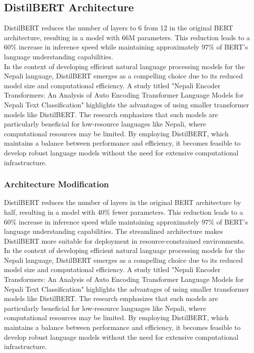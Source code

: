 \subsection{DistilBERT Architecture}
DistilBERT reduces the number of layers to 6 from 12 in the original BERT architecture, resulting in a model with 66M parameters. This reduction leads to a 60\% increase in inference speed while maintaining approximately 97\% of BERT's language understanding capabilities.\\



In the context of developing efficient natural language processing models for the Nepali language, DistilBERT emerges as a compelling choice due to its reduced model size and computational efficiency. A study titled "Nepali Encoder Transformers: An Analysis of Auto Encoding Transformer Language Models for Nepali Text Classification" highlights the advantages of using smaller transformer models like DistilBERT. The research emphasizes that such models are particularly beneficial for low-resource languages like Nepali, where computational resources may be limited. By employing DistilBERT, which maintains a balance between performance and efficiency, it becomes feasible to develop robust language models without the need for extensive computational infrastructure.


\subsubsection{Architecture Modification}
DistilBERT reduces the number of layers in the original BERT architecture by half, resulting in a model with 40\% fewer parameters. This reduction leads to a 60\% increase in inference speed while maintaining approximately 97\% of BERT's language understanding capabilities. The streamlined architecture makes DistilBERT more suitable for deployment in resource-constrained environments.
In the context of developing efficient natural language processing models for the Nepali language, DistilBERT emerges as a compelling choice due to its reduced model size and computational efficiency. A study titled "Nepali Encoder Transformers: An Analysis of Auto Encoding Transformer Language Models for Nepali Text Classification" highlights the advantages of using smaller transformer models like DistilBERT. The research emphasizes that such models are particularly beneficial for low-resource languages like Nepali, where computational resources may be limited. By employing DistilBERT, which maintains a balance between performance and efficiency, it becomes feasible to develop robust language models without the need for extensive computational infrastructure.

